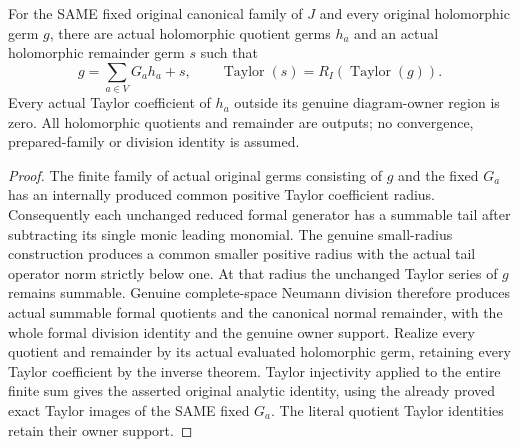 \begin{theorem}
\label{hir:actual-original-canonical-reduced-analytic-division}
\leanok
For the SAME fixed original canonical family of $J$ and every original
holomorphic germ $g$, there are actual holomorphic quotient germs $h_a$
and an actual holomorphic remainder germ $s$ such that
\[
 g=\sum_{a\in V}G_a h_a+s,
 \qquad \operatorname{Taylor}(s)=R_I(\operatorname{Taylor}(g)).
\]
Every actual Taylor coefficient of $h_a$ outside its genuine diagram-owner
region is zero. All holomorphic quotients and remainder are outputs;
no convergence, prepared-family or division identity is assumed.
\end{theorem}
\begin{proof}
The finite family of actual original germs consisting of $g$ and the fixed
$G_a$ has an internally produced common positive Taylor coefficient radius.
Consequently each unchanged reduced formal generator has a summable tail
after subtracting its single monic leading monomial. The genuine small-radius
construction produces a common smaller positive radius with the actual tail
operator norm strictly below one. At that radius the unchanged Taylor series
of $g$ remains summable. Genuine complete-space Neumann division therefore
produces actual summable formal quotients and the canonical normal remainder,
with the whole formal division identity and the genuine owner support.
Realize every quotient and remainder by its actual evaluated holomorphic
germ, retaining every Taylor coefficient by the inverse theorem. Taylor
injectivity applied to the entire finite sum gives the asserted original
analytic identity, using the already proved exact Taylor images of the SAME
fixed $G_a$. The literal quotient Taylor identities retain their owner support.
\end{proof}

